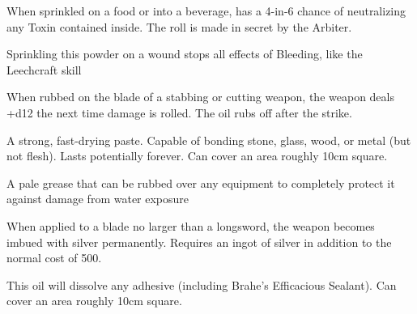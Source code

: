 {  \CHYMISTRY[
    Name=Powdered Bezoar,
    Link=chymistry-powdered-bezoar,
    Cost=500\FE,
    Duration=0 ,
    Toxin=No,
    Narcotic=No 
  ]


  When sprinkled on a food or into a beverage, has a 4-in-6 chance of neutralizing any Toxin contained inside.  The roll is made in secret by the Arbiter.


  \CHYMISTRY[
    Name=Woundseal,
    Link=chymistry-woundseal,
    Cost=500\FE,
    Duration=0 ,
    Toxin=No,
    Narcotic=No 
  ]


  Sprinkling this powder on a wound stops all effects of Bleeding, like the Leechcraft skill 


  \CHYMISTRY[
    Name=Boyle's Sharpening Paste,
    Link=chymistry-boyles-sharpening-paste,
    Cost=500\FE,
    Duration=0 ,
    Toxin=No,
    Narcotic=No 
  ]
  When rubbed on the blade of a stabbing or cutting weapon, the weapon deals +d12 the next time damage is rolled.  The oil rubs off after the strike.


  \CHYMISTRY[
    Name=Brahe's Efficacious Sealant,
    Link=chymistry-brahes-efficacious-sealant,
    Cost=500\AU,
    Duration=0 ,
    Toxin=No,
    Narcotic=No 
  ]
  A strong, fast-drying paste. Capable of bonding stone, glass, wood, or metal (but not flesh). Lasts potentially forever.  Can cover an area roughly 10cm square.


  \CHYMISTRY[
    Name=Faivre's Aqua Grease,
    Link=chymistry-faivres-aqua grease,
    Cost=500\FE,
    Duration=0 ,
    Toxin=No,
    Narcotic=No 
  ]
  A pale grease that can be rubbed over any equipment to completely protect it against damage from water exposure

  \CHYMISTRY[
    Name=Tesla's Silver Wash,
    Link=chymistry-teslas-silver wash,
    Cost=500\AG,
    Duration=0 ,
    Toxin=No,
    Narcotic=No 
  ]
  When applied to a blade no larger than a longsword, the weapon becomes imbued with silver permanently.  Requires an ingot of silver in addition to the normal cost of 500\AG.

  \newpage

  \CHYMISTRY[
    Name=Wei Boyang's Alkahest,
    Link=chymistry-wei boyangs-alkahest,
    Cost=500\AU,
    Duration=0 ,
    Toxin=No,
    Narcotic=No 
  ]

  This oil will dissolve any adhesive (including Brahe's Efficacious Sealant).  Can cover an area roughly 10cm square.



}
